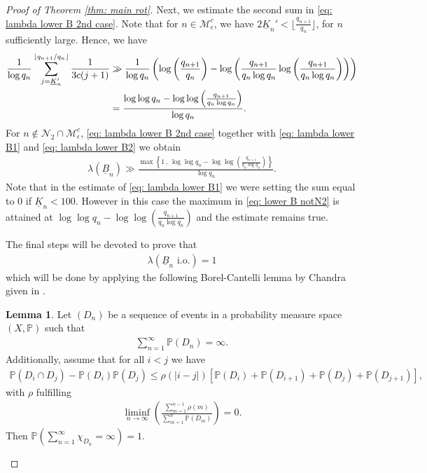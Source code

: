 \documentclass[11pt]{amsart}
\theoremstyle{definition}
\newtheorem{lemma}[definition]{Lemma}
\numberwithin{equation}{section}
\def\P{\mathbb{P}}
\begin{document}
\begin{proof}[Proof of Theorem \ref{thm: main rot}]
Next, we estimate the second sum in \eqref{eq: lambda lower B 2nd case}. 
Note that for $n\in\mathcal{M}_{\epsilon}^c$, we have $2\underline{K}_n'< \lfloor \frac{q_{n+1}}{q_n}\rfloor$, for $n$ sufficiently large.  
Hence, we have 
\begin{align}
 \frac{1}{ \log q_n}\sum_{j=\underline{K}_n'}^{\lfloor q_{n+1}/q_n\rfloor}\frac{1}{3c(j+1)}
 &\gg \frac{1}{\log q_n}\left( \log \left(\frac{ q_{n+1}}{q_n}\right)-
 \log \left( \frac{q_{n+1}}{q_n\log q_n}\log\left( \frac{q_{n+1}}{q_n\log q_n}\right)\right)\right)\notag\\
 &= \frac{\log\log q_n -\log\log \left(\frac{q_{n+1}}{q_n\log q_n}\right) }{\log q_n}.\label{eq: lambda lower B2}
\end{align}
For $n\notin \mathcal{N}_{2}\cap\mathcal{M}_{\epsilon}^c$, \eqref{eq: lambda lower B 2nd case} together with \eqref{eq: lambda lower B1} and \eqref{eq: lambda lower B2} we obtain 
\begin{align}
 \lambda(\underline{B}_n)\gg 
 \frac{\max\left\{ 1\, ,\, \log\log q_n -\log\log \left(\frac{q_{n+1}}{q_n\log q_n}\right) \right\}}{\log q_n}.\label{eq: lower B notN2}
\end{align}
Note that in the estimate of \eqref{eq: lambda lower B1} we were setting the sum equal to $0$ if $\underline{K}_n<100$. However in this case the maximum in \eqref{eq: lower B notN2} is attained at $\log\log q_n -\log\log \left(\frac{q_{n+1}}{q_n\log q_n}\right)$ and the estimate remains true.







The final steps will be devoted to prove that 
\begin{align}
 \lambda(\underline{B}_n\text{ i.o.})=1\label{eq: An io}
\end{align}
which will be done by applying the following Borel-Cantelli lemma by Chandra given in \cite[Rem.~1]{chandra}. 


\begin{lemma}\label{lem:chandra}
 Let $(D_n)$ be a sequence of events in a probability measure space $(X,\mathbb{P})$ such that
 \begin{align*}
  \sum_{n=1}^{\infty}\P(D_n)=\infty.
 \end{align*}
 Additionally, assume that
 for all $i<j$ we have
 \begin{align}
 \P(D_i \cap D_j)- \P(D_i)\P(D_j)\leq  \rho(|i-j|)[\P(D_i)+\P(D_{i+1})+ \P(D_j)+ \P(D_{j+1})],\label{eq: cond on Bi}
 \end{align}
 with $\rho$ fulfilling 
 \begin{align*}
  \liminf_{n\to\infty}\left(\frac{\sum_{m=1}^{n-1} \rho(m)}{\sum_{m=1}^n\P(D_m)}\right)=0. 
 \end{align*}
 Then $\P(\sum_{n=1}^{\infty}\chi_{D_n}=\infty)=1$. 
\end{lemma}


\end{proof}
\end{document}
